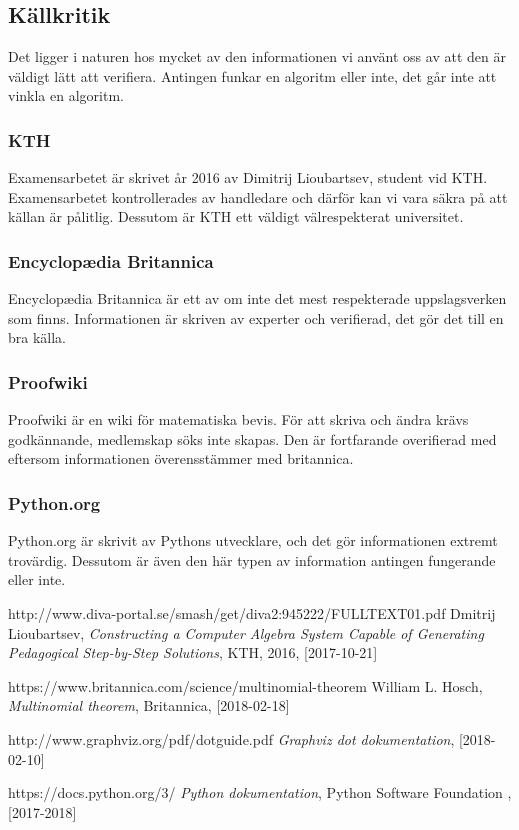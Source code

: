 \documentclass[12pt,a4paper]{article}
\begin{document}
\subsection{Källkritik}
Det ligger i naturen hos mycket av den informationen vi använt oss av att den är väldigt lätt att verifiera. Antingen funkar en algoritm eller inte, det går inte att vinkla en algoritm. 
\subsubsection{KTH}
Examensarbetet är skrivet år 2016 av Dimitrij Lioubartsev, student vid KTH. Examensarbetet kontrollerades av handledare och därför kan vi vara säkra på att källan är pålitlig. Dessutom är KTH ett väldigt välrespekterat universitet.
\subsubsection{Encyclopædia Britannica}
Encyclopædia Britannica är ett av om inte det mest respekterade uppslagsverken som finns. Informationen är skriven av experter och verifierad, det gör det till en bra källa. 
\subsubsection{Proofwiki}
Proofwiki är en wiki för matematiska bevis. För att skriva och ändra krävs godkännande, medlemskap söks inte skapas. Den är fortfarande overifierad med eftersom informationen överensstämmer med britannica.
\subsubsection{Python.org}
Python.org är skrivit av Pythons utvecklare, och det gör informationen extremt trovärdig. Dessutom är även den här typen av information antingen fungerande eller inte. 

\begin{thebibliography}{9}

  http://www.diva-portal.se/smash/get/diva2:945222/FULLTEXT01.pdf
  Dmitrij Lioubartsev,
  \textit{Constructing a Computer Algebra System Capable of Generating Pedagogical Step-by-Step Solutions},
  KTH,
  2016,
  [2017-10-21]

  https://www.britannica.com/science/multinomial-theorem
  William L. Hosch,
  \textit{Multinomial theorem},
  Britannica,
  [2018-02-18]

  http://www.graphviz.org/pdf/dotguide.pdf
  \textit{Graphviz dot dokumentation},
  [2018-02-10]

  https://docs.python.org/3/
  \textit{Python dokumentation},
  Python Software Foundation ,
  [2017-2018]
\end{thebibliography}
\end{document}
